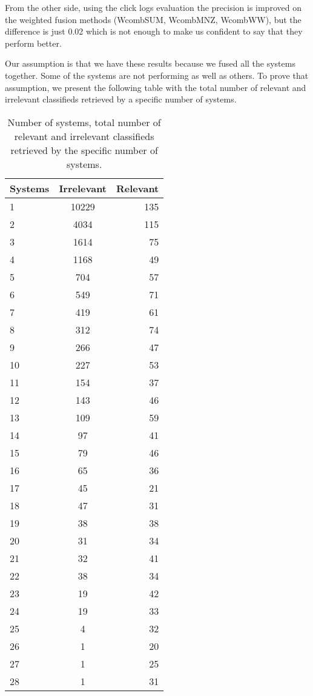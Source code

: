 From the other side, using the click logs evaluation the precision is improved on the weighted fusion methods (WcombSUM, WcombMNZ, WcombWW), but the difference is just 0.02 which is not enough to make us confident to say that they perform better.

Our assumption is that we have these results because we fused all the systems together. Some of the systems are not performing as well as others. To prove that assumption, we present the following table with the total number of relevant and irrelevant classifieds retrieved by a specific number of systems.


\begin{table}[H]
\begin{center}
\caption{Number of systems, total number of relevant and irrelevant classifieds retrieved by the specific number of systems.}
\begin{tabular}{lcr}
\midrule
 Systems & Irrelevant & Relevant \\
 \midrule
1 & 10229 & 135 \\
2 & 4034 & 115 \\
3 & 1614 & 75 \\
4 & 1168 & 49 \\
5 & 704 & 57 \\
6 & 549 & 71 \\
7 & 419 & 61 \\
8 & 312 & 74 \\
9 & 266 & 47 \\
10 & 227 & 53 \\
11 & 154 & 37 \\
12 & 143 & 46 \\
13 & 109 & 59 \\
14 & 97 & 41 \\
15 & 79 & 46 \\
16 & 65 & 36 \\
17 & 45 & 21 \\
18 & 47 & 31 \\
19 & 38 & 38 \\
20 & 31 & 34 \\
21 & 32 & 41 \\
22 & 38 & 34 \\
23 & 19 & 42 \\
24 & 19 & 33 \\
25 & 4 & 32 \\
26 & 1 & 20 \\
27 & 1 & 25 \\
28 & 1 & 31 \\
\bottomrule
\end{tabular}
\end{center}
\end{table}

